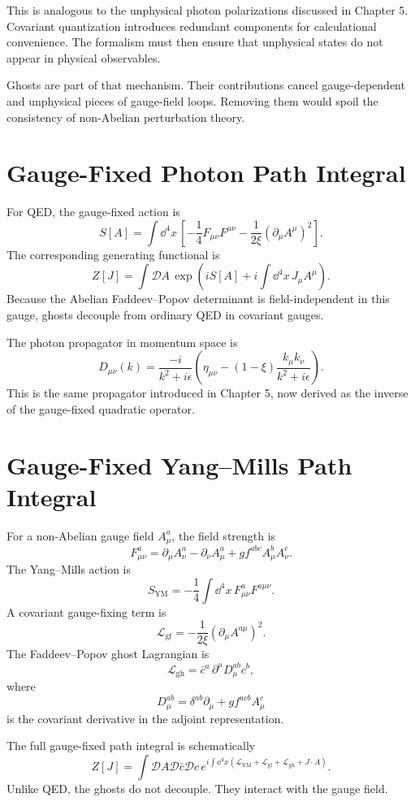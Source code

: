 This is analogous to the unphysical photon polarizations discussed in Chapter 5.
Covariant quantization introduces redundant components for calculational
convenience. The formalism must then ensure that unphysical states do not appear
in physical observables.

Ghosts are part of that mechanism. Their contributions cancel gauge-dependent
and unphysical pieces of gauge-field loops. Removing them would spoil the
consistency of non-Abelian perturbation theory.

\section{Gauge-Fixed Photon Path Integral}

For QED, the gauge-fixed action is
\[
    S[A]
    = \int\dd^4x\,
      \left[-\frac{1}{4}F_{\mu\nu}F^{\mu\nu}
      -\frac{1}{2\xi}(\partial_\mu A^\mu)^2\right].
\]
The corresponding generating functional is
\[
    Z[J]
    = \int\mathcal{D}A\,
      \exp\left(iS[A]+i\int\dd^4x\,J_\mu A^\mu\right).
\]
Because the Abelian Faddeev--Popov determinant is field-independent in this
gauge, ghosts decouple from ordinary QED in covariant gauges.

The photon propagator in momentum space is
\[
    D_{\mu\nu}(k)
    = \frac{-i}{k^2+i\epsilon}
      \left(\eta_{\mu\nu}-(1-\xi)\frac{k_\mu k_\nu}{k^2+i\epsilon}\right).
\]
This is the same propagator introduced in Chapter 5, now derived as the inverse
of the gauge-fixed quadratic operator.

\section{Gauge-Fixed Yang--Mills Path Integral}

For a non-Abelian gauge field \(A_\mu^a\), the field strength is
\[
    F_{\mu\nu}^a
    = \partial_\mu A_\nu^a-\partial_\nu A_\mu^a
      +g f^{abc}A_\mu^b A_\nu^c.
\]
The Yang--Mills action is
\[
    S_{\mathrm{YM}}
    = -\frac{1}{4}\int\dd^4x\,F_{\mu\nu}^aF^{a\mu\nu}.
\]
A covariant gauge-fixing term is
\[
    \mathcal{L}_{\mathrm{gf}}
    = -\frac{1}{2\xi}(\partial_\mu A^{a\mu})^2.
\]
The Faddeev--Popov ghost Lagrangian is
\[
    \mathcal{L}_{\mathrm{gh}}
    = \bar c^a\,\partial^\mu D_\mu^{ab}c^b,
\]
where
\[
    D_\mu^{ab}=\delta^{ab}\partial_\mu+g f^{acb}A_\mu^c
\]
is the covariant derivative in the adjoint representation.

The full gauge-fixed path integral is schematically
\[
    Z[J]
    = \int\mathcal{D}A\mathcal{D}\bar c\mathcal{D}c\,
      e^{i\int\dd^4x(\mathcal{L}_{\mathrm{YM}}+\mathcal{L}_{\mathrm{gf}}+\mathcal{L}_{\mathrm{gh}}+J\cdot A)}.
\]
Unlike QED, the ghosts do not decouple. They interact with the gauge field.

